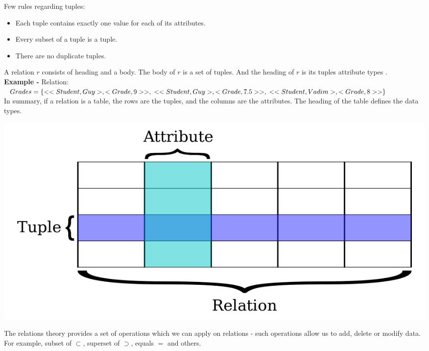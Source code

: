 \documentclass[oneside]{book}
\begin{document}

Few rules regarding tuples:
\begin{itemize}
	\item Each tuple contains exactly one value for each of its attributes.
	\item Every subset of a tuple is a tuple.
	\item There are no duplicate tuples.
\end{itemize}

A relation $r$ consists of heading and a body. The body of $r$ is a set of tuples. And the heading of $r$ is its tuples attribute types \cite[p.~146]{introtodb}.\\

\textbf{Example -} Relation: 
$Grades = \{<<Student, Guy>, <Grade, 9>>,\\
<<Student, Guy>, <Grade, 7.5>>,\\
<<Student, Vadim>, <Grade, 8>>\}$\\

In summary, if a relation is a table, the rows are the tuples, and the columns are the attributes. The heading of the table defines the data types.

\includegraphics[scale=0.35]{relational_database}

The relations theory provides a set of operations which we can apply on relations - such operations allow us to add, delete or modify data. For example, subset of $\subset$, superset of $\supset$, equals $=$ and others.\\
\end{document}
